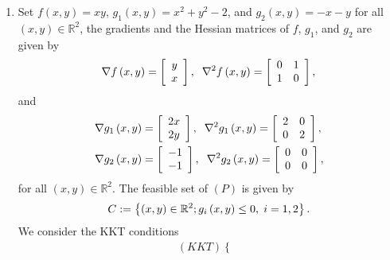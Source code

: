 \documentclass[a4paper]{article}
\numberwithin{equation}{section}
\begin{document}
\begin{enumerate}
\item Set $f\left( {x,y} \right) = xy$, ${g_1}\left( {x,y} \right) = {x^2} + {y^2} - 2$, and ${g_2}\left( {x,y} \right) =  - x - y$ for all $\left(x,y\right)\in \mathbb{R}^2$, the gradients and the Hessian matrices of $f$, $g_1$, and $g_2$ are given by
\begin{align}
\nabla f\left( {x,y} \right) = \left[ {\begin{array}{*{20}{c}}
y\\
x
\end{array}} \right],\hspace{0.2cm} {\nabla ^2}f\left( {x,y} \right) = \left[ {\begin{array}{*{20}{c}}
0&1\\
1&0
\end{array}} \right],
\end{align}
and
\begin{align}
\nabla {g_1}\left( {x,y} \right) &= \left[ {\begin{array}{*{20}{c}}
{2x}\\
{2y}
\end{array}} \right],\hspace{0.2cm} {\nabla ^2}{g_1}\left( {x,y} \right) = \left[ {\begin{array}{*{20}{c}}
2&0\\
0&2
\end{array}} \right],\\
\nabla {g_2}\left( {x,y} \right) &= \left[ {\begin{array}{*{20}{c}}
{ - 1}\\
{ - 1}
\end{array}} \right],\hspace{0.2cm} {\nabla ^2}{g_2}\left( {x,y} \right) = \left[ {\begin{array}{*{20}{c}}
0&0\\
0&0
\end{array}} \right],
\end{align}
for all $\left(x,y\right)\in \mathbb{R}^2$. The feasible set of $\left(P\right)$ is given by
\begin{align}
C: = \left\{ {\left( {x,y} \right) \in {\mathbb{R}^2};{g_i}\left( {x,y} \right) \le 0, \hspace{0.1cm} i = 1,2} \right\}.
\end{align}
We consider the KKT conditions
\begin{align}
\left( {KKT} \right)\left\{ {\begin{array}{*{20}{l}}

\end{array}}
\end{align}
\end{enumerate}
\end{document}
